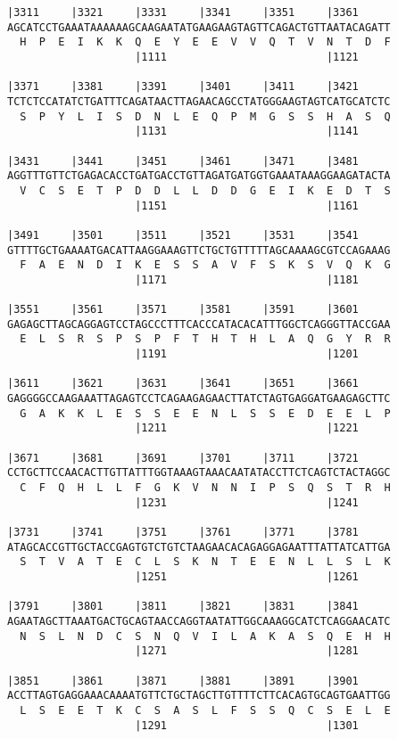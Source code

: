 \documentclass{article}
\begin{document}
\begin{Verbatim}
|3311     |3321     |3331     |3341     |3351     |3361     
AGCATCCTGAAATAAAAAAGCAAGAATATGAAGAAGTAGTTCAGACTGTTAATACAGATT
  H  P  E  I  K  K  Q  E  Y  E  E  V  V  Q  T  V  N  T  D  F
                    |1111                         |1121     
  
|3371     |3381     |3391     |3401     |3411     |3421     
TCTCTCCATATCTGATTTCAGATAACTTAGAACAGCCTATGGGAAGTAGTCATGCATCTC
  S  P  Y  L  I  S  D  N  L  E  Q  P  M  G  S  S  H  A  S  Q
                    |1131                         |1141     
  
|3431     |3441     |3451     |3461     |3471     |3481     
AGGTTTGTTCTGAGACACCTGATGACCTGTTAGATGATGGTGAAATAAAGGAAGATACTA
  V  C  S  E  T  P  D  D  L  L  D  D  G  E  I  K  E  D  T  S
                    |1151                         |1161     
  
|3491     |3501     |3511     |3521     |3531     |3541     
GTTTTGCTGAAAATGACATTAAGGAAAGTTCTGCTGTTTTTAGCAAAAGCGTCCAGAAAG
  F  A  E  N  D  I  K  E  S  S  A  V  F  S  K  S  V  Q  K  G
                    |1171                         |1181     
  
|3551     |3561     |3571     |3581     |3591     |3601     
GAGAGCTTAGCAGGAGTCCTAGCCCTTTCACCCATACACATTTGGCTCAGGGTTACCGAA
  E  L  S  R  S  P  S  P  F  T  H  T  H  L  A  Q  G  Y  R  R
                    |1191                         |1201     
  
|3611     |3621     |3631     |3641     |3651     |3661     
GAGGGGCCAAGAAATTAGAGTCCTCAGAAGAGAACTTATCTAGTGAGGATGAAGAGCTTC
  G  A  K  K  L  E  S  S  E  E  N  L  S  S  E  D  E  E  L  P
                    |1211                         |1221     
  
|3671     |3681     |3691     |3701     |3711     |3721     
CCTGCTTCCAACACTTGTTATTTGGTAAAGTAAACAATATACCTTCTCAGTCTACTAGGC
  C  F  Q  H  L  L  F  G  K  V  N  N  I  P  S  Q  S  T  R  H
                    |1231                         |1241     
  
|3731     |3741     |3751     |3761     |3771     |3781     
ATAGCACCGTTGCTACCGAGTGTCTGTCTAAGAACACAGAGGAGAATTTATTATCATTGA
  S  T  V  A  T  E  C  L  S  K  N  T  E  E  N  L  L  S  L  K
                    |1251                         |1261     
  
|3791     |3801     |3811     |3821     |3831     |3841     
AGAATAGCTTAAATGACTGCAGTAACCAGGTAATATTGGCAAAGGCATCTCAGGAACATC
  N  S  L  N  D  C  S  N  Q  V  I  L  A  K  A  S  Q  E  H  H
                    |1271                         |1281     
  
|3851     |3861     |3871     |3881     |3891     |3901     
ACCTTAGTGAGGAAACAAAATGTTCTGCTAGCTTGTTTTCTTCACAGTGCAGTGAATTGG
  L  S  E  E  T  K  C  S  A  S  L  F  S  S  Q  C  S  E  L  E
                    |1291                         |1301     
  

\end{Verbatim}
\end{document}
